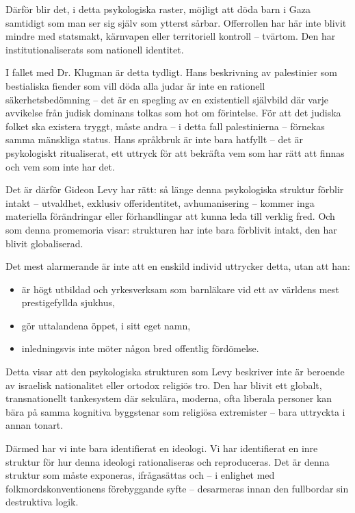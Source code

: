 Därför blir det, i detta psykologiska raster, möjligt att döda barn i Gaza samtidigt som man ser sig själv som ytterst sårbar. Offerrollen har här inte blivit mindre med statsmakt, kärnvapen eller territoriell kontroll – tvärtom. Den har institutionaliserats som nationell identitet.

I fallet med Dr. Klugman är detta tydligt. Hans beskrivning av palestinier som bestialiska fiender som vill döda alla judar är inte en rationell säkerhetsbedömning – det är en spegling av en existentiell självbild där varje avvikelse från judisk dominans tolkas som hot om förintelse. För att det judiska folket ska existera tryggt, måste andra – i detta fall palestinierna – förnekas samma mänskliga status. Hans språkbruk är inte bara hatfyllt – det är psykologiskt ritualiserat, ett uttryck för att bekräfta vem som har rätt att finnas och vem som inte har det.

Det är därför Gideon Levy har rätt: så länge denna psykologiska struktur förblir intakt – utvaldhet, exklusiv offeridentitet, avhumanisering – kommer inga materiella förändringar eller förhandlingar att kunna leda till verklig fred. Och som denna promemoria visar: strukturen har inte bara förblivit intakt, den har blivit globaliserad.


Det mest alarmerande är inte att en enskild individ uttrycker detta, utan att han:
\begin{itemize}
    \item är högt utbildad och yrkesverksam som barnläkare vid ett av världens mest prestigefyllda sjukhus,
    \item gör uttalandena öppet, i sitt eget namn,
    \item inledningsvis inte möter någon bred offentlig fördömelse.
\end{itemize}

Detta visar att den psykologiska strukturen som Levy beskriver inte är beroende av israelisk nationalitet eller ortodox religiös tro. Den har blivit ett globalt, transnationellt tankesystem där sekulära, moderna, ofta liberala personer kan bära på samma kognitiva byggstenar som religiösa extremister – bara uttryckta i annan tonart.

Därmed har vi inte bara identifierat en ideologi. Vi har identifierat en inre struktur för hur denna ideologi rationaliseras och reproduceras. Det är denna struktur som måste exponeras, ifrågasättas och – i enlighet med folkmordskonventionens förebyggande syfte – desarmeras innan den fullbordar sin destruktiva logik.


